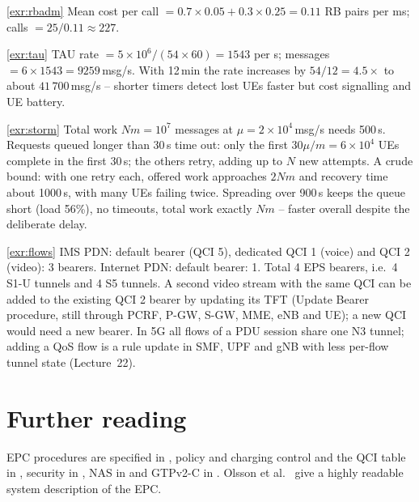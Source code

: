 \documentclass[11pt,a4paper]{article}
\begin{document}
\begin{solutionbox}{\ref{exr:rbadm}}
Mean cost per call $= 0.7\times0.05 + 0.3\times0.25 = 0.11$ RB pairs per ms; calls $= 25/0.11 \approx 227$.
\end{solutionbox}

\begin{solutionbox}{\ref{exr:tau}}
TAU rate $= 5\times10^6/(54\times60) = 1543$ per s; messages $= 6\times1543 = 9259$\,msg/s. With 12\,min the
rate increases by $54/12 = 4.5\times$ to about $41\,700$\,msg/s -- shorter timers detect lost UEs faster but
cost signalling and UE battery.
\end{solutionbox}

\begin{solutionbox}{\ref{exr:storm}}
Total work $Nm = 10^7$ messages at $\mu = 2\times10^4$\,msg/s needs 500\,s. Requests queued longer than 30\,s
time out: only the first $30\mu/m = 6\times10^4$ UEs complete in the first 30\,s; the others retry, adding up to
$N$ new attempts. A crude bound: with one retry each, offered work approaches $2Nm$ and recovery time about
1000\,s, with many UEs failing twice. Spreading over 900\,s keeps the queue short (load 56\%), no timeouts,
total work exactly $Nm$ -- faster overall despite the deliberate delay.
\end{solutionbox}

\begin{solutionbox}{\ref{exr:flows}}
IMS PDN: default bearer (QCI 5), dedicated QCI 1 (voice) and QCI 2 (video): 3 bearers. Internet PDN: default
bearer: 1. Total 4 EPS bearers, i.e.\ 4 S1-U tunnels and 4 S5 tunnels. A second video stream with the same QCI
can be added to the existing QCI 2 bearer by updating its TFT (Update Bearer procedure, still through PCRF,
P-GW, S-GW, MME, eNB and UE); a new QCI would need a new bearer. In 5G all flows of a PDU session share one
N3 tunnel; adding a QoS flow is a rule update in SMF, UPF and gNB with less per-flow tunnel state
(Lecture~22).
\end{solutionbox}

\section{Further reading}
EPC procedures are specified in \cite{ts23401}, policy and charging control and the QCI table in
\cite{ts23203}, security in \cite{ts33401}, NAS in \cite{ts24301} and GTPv2-C in \cite{ts29274}. Olsson et
al.\ \cite{olsson2013epc} give a highly readable system description of the EPC.

\printbibliography[heading=subbibliography,title={\ACNstrRefs}]
\end{document}
